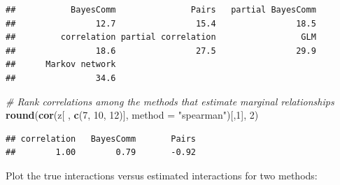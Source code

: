 \documentclass[11pt,]{article}
\newenvironment{Shaded}{\begin{snugshade}}{\end{snugshade}}
\newcommand{\KeywordTok}[1]{\textcolor[rgb]{0.13,0.29,0.53}{\textbf{{#1}}}}
\newcommand{\DataTypeTok}[1]{\textcolor[rgb]{0.13,0.29,0.53}{{#1}}}
\newcommand{\DecValTok}[1]{\textcolor[rgb]{0.00,0.00,0.81}{{#1}}}
\newcommand{\StringTok}[1]{\textcolor[rgb]{0.31,0.60,0.02}{{#1}}}
\newcommand{\CommentTok}[1]{\textcolor[rgb]{0.56,0.35,0.01}{\textit{{#1}}}}
\newcommand{\NormalTok}[1]{{#1}}
\begin{document}
\begin{verbatim}
##           BayesComm               Pairs   partial BayesComm 
##                12.7                15.4                18.5 
##         correlation partial correlation                 GLM 
##                18.6                27.5                29.9 
##      Markov network 
##                34.6
\end{verbatim}

\begin{Shaded}
\begin{Highlighting}[]
\CommentTok{# Rank correlations among the methods that estimate marginal relationships}
\KeywordTok{round}\NormalTok{(}\KeywordTok{cor}\NormalTok{(z[ , }\KeywordTok{c}\NormalTok{(}\DecValTok{7}\NormalTok{, }\DecValTok{10}\NormalTok{, }\DecValTok{12}\NormalTok{)], }\DataTypeTok{method =} \StringTok{"spearman"}\NormalTok{)[,}\DecValTok{1}\NormalTok{], }\DecValTok{2}\NormalTok{)}
\end{Highlighting}
\end{Shaded}

\begin{verbatim}
## correlation   BayesComm       Pairs 
##        1.00        0.79       -0.92
\end{verbatim}

Plot the true interactions versus estimated interactions for two
methods:
\end{document}

